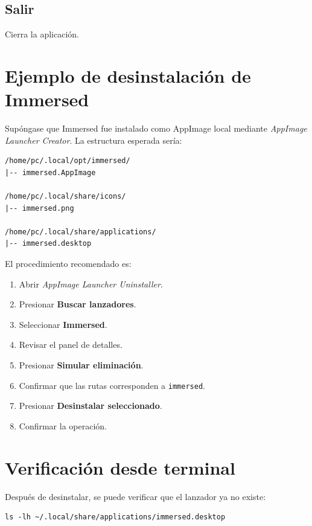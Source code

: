 \documentclass[11pt,a4paper]{article}
\begin{document}
\subsection{Salir}

Cierra la aplicación.

\section{Ejemplo de desinstalación de Immersed}

Supóngase que Immersed fue instalado como AppImage local mediante \textit{AppImage Launcher Creator}. La estructura esperada sería:

\begin{lstlisting}[style=textstyle]
/home/pc/.local/opt/immersed/
|-- immersed.AppImage

/home/pc/.local/share/icons/
|-- immersed.png

/home/pc/.local/share/applications/
|-- immersed.desktop
\end{lstlisting}

El procedimiento recomendado es:

\begin{enumerate}[leftmargin=1.2cm]
    \item Abrir \textit{AppImage Launcher Uninstaller}.
    \item Presionar \textbf{Buscar lanzadores}.
    \item Seleccionar \textbf{Immersed}.
    \item Revisar el panel de detalles.
    \item Presionar \textbf{Simular eliminación}.
    \item Confirmar que las rutas corresponden a \texttt{immersed}.
    \item Presionar \textbf{Desinstalar seleccionado}.
    \item Confirmar la operación.
\end{enumerate}

\section{Verificación desde terminal}

Después de desinstalar, se puede verificar que el lanzador ya no existe:

\begin{lstlisting}[style=bashstyle]
ls -lh ~/.local/share/applications/immersed.desktop
\end{lstlisting}
\end{document}
